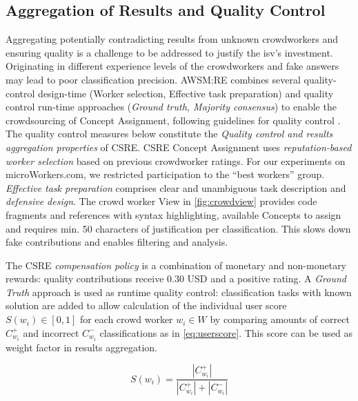 \vspace{-15pt}
\subsection{Aggregation of Results and Quality Control}
\vspace{10pt}

Aggregating potentially contradicting results from unknown crowdworkers and ensuring quality is a challenge to be addressed to justify the \gls{isv}'s investment.
Originating in different experience levels of the crowdworkers and fake answers may lead to poor classification precision.
AWSM:RE combines several quality-control design-time (Worker selection, Effective task preparation) and quality control run-time approaches (\emph{Ground truth, Majority consensus}) \autocite{Heil2018CSRE,Heil2019CSRECCIS} to enable the crowdsourcing of \gls{Concept Assignment}, following guidelines for quality control \autocite{Daniel2018CrowdsourcingQuality,Allahbakhsh2013}.
The quality control measures below constitute the \emph{Quality control and results aggregation properties} of CSRE.
CSRE \gls{Concept Assignment} uses \emph{reputation-based worker selection} based on previous crowdworker ratings.
For our experiments on microWorkers.com, we restricted participation to the ``best workers'' group.
\emph{Effective task preparation} comprises clear and unambiguous task description and \emph{defensive design}.
The crowd worker View in \cref{fig:crowdview} provides code fragments and references with syntax highlighting, available \glspl{Concept} to assign and requires min. 50 characters of justification per classification.
This slows down fake contributions and enables filtering and analysis.

The CSRE \emph{compensation policy} is a combination of monetary and non-monetary rewards: quality contributions receive 0.30 USD and a positive rating.
A \emph{Ground Truth} approach is used as runtime quality control: classification tasks with known solution are added to allow calculation of the individual user score \(S(w_i) \in [0,1]\) for each crowd worker \(w_i\in W\) by comparing amounts of correct \(C^+_{w_i}\) and incorrect \(C^-_{w_i}\) classifications as in \cref{eq:userscore}.
This score can be used as weight factor in results aggregation.

\begin{equation}S(w_i) = \frac{|C^+_{w_i}|}{|C^+_{w_i}| + |C^-_{w_i}|}\label{eq:userscore}\end{equation}

